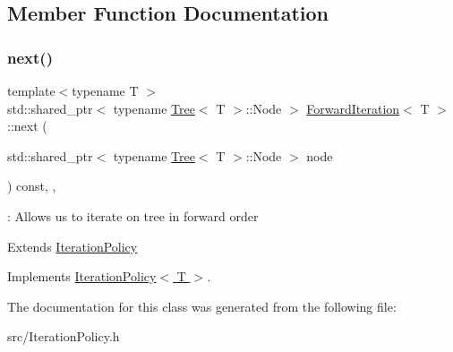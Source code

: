 \subsection{Member Function Documentation}
\mbox{\label{classForwardIteration_aec16f756354bad563a57da6157448203}} 
\subsubsection{\texorpdfstring{next()}{next()}}
{\footnotesize\ttfamily template$<$typename T $>$ \\
std\+::shared\+\_\+ptr$<$ typename \hyperlink{classTree}{Tree}$<$ T $>$\+::Node $>$ \hyperlink{classForwardIteration}{Forward\+Iteration}$<$ T $>$\+::next (\begin{DoxyParamCaption}\item[{std\+::shared\+\_\+ptr$<$ typename \hyperlink{classTree}{Tree}$<$ T $>$\+::Node $>$}]{node }\end{DoxyParamCaption}) const\hspace{0.3cm}{\ttfamily [override]}, {\ttfamily [virtual]}, {\ttfamily [noexcept]}}



\+: Allows us to iterate on tree in forward order 

Extends \hyperlink{classIterationPolicy}{Iteration\+Policy} 

Implements \hyperlink{classIterationPolicy_a69a898482a3a2ec09fd6efec002bace8}{Iteration\+Policy$<$ T $>$}.



The documentation for this class was generated from the following file\+:\begin{DoxyCompactItemize}
\item 
src/Iteration\+Policy.\+h\end{DoxyCompactItemize}
